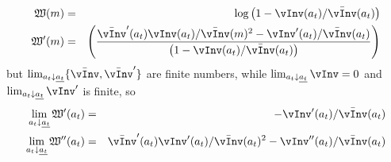 \newcommand{\vPF}{\bar{\vInv}}
\newcommand{\cPF}{\bar{\cFunc}}
\newcommand{\W}{\mathfrak{W}}
\newcommand{\at}{a_{t}}
\newcommand{\atDown}{\lim_{\at \downarrow \underline{\at}}}
  \begin{eqnarray}
    \W(m) & = & \log \left(1-\vInv(\at)/\vPF(\at)\right)
\\ \W^{\prime}(m) & = & \left(\frac{\vPF^{\prime}(\at)\vInv(\at)/\vPF(m)^2-\vInv^{\prime}(\at)/\vPF(\at)}{\left(1-\vInv(\at)/\vPF(\at)\right) }\right)
  \end{eqnarray}
but $\atDown \{\vPF,\vPF^{\prime}\}$ are finite numbers, while $\atDown \vInv = 0$ and $\atDown \vInv^{\prime}$ is finite, so
  \begin{eqnarray}
   \atDown \W^{\prime}(\at) & = & -\vInv^{\prime}(\at)/\vPF(\at)
\\ \atDown \W^{\prime\prime}(\at) & = & \vPF^{\prime}(\at)\vInv^{\prime}(\at)/\vPF(\at)^{2}-\vInv^{\prime\prime}(\at)/\vPF(\at  )
  \end{eqnarray}


